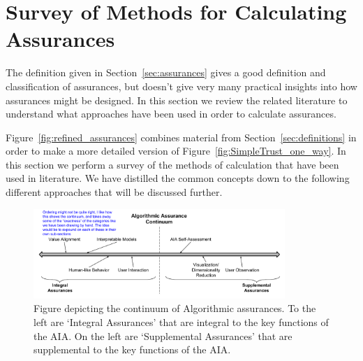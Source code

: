 \section{Survey of Methods for Calculating Assurances} \label{sec:synthesis}
    The definition given in Section~\ref{sec:assurances} gives a good definition and classification of assurances, but doesn't give very many practical insights into how assurances might be designed. In this section we review the related literature to understand what approaches have been used in order to calculate assurances.
    
    Figure~\ref{fig:refined_assurances} combines material from Section~\ref{sec:definitions} in order to make a more detailed version of Figure~\ref{fig:SimpleTrust_one_way}. In this section we perform a survey of the methods of calculation that have been used in literature. We have distilled the common concepts down to the following different approaches that will be discussed further.

    \begin{figure}[htbp]
        \centering
        \includegraphics[width=0.85\textwidth]{Figures/Algorithmic_approach.pdf}
        \caption{Figure depicting the continuum of Algorithmic assurances. To the left are `Integral Assurances' that are integral to the key functions of the AIA. On the left are `Supplemental Assurances' that are supplemental to the key functions of the AIA.}
        \label{fig:assurance_continuum}
    \end{figure}









